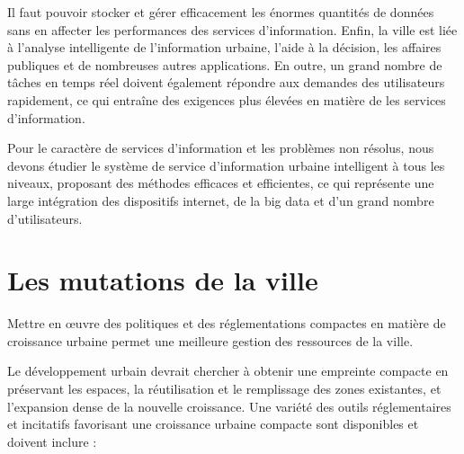 Il faut pouvoir stocker et gérer efficacement les énormes quantités de données sans en affecter
les performances des services d'information.
Enfin, la ville est liée à l'analyse intelligente de l'information urbaine, l'aide à la décision,
les affaires publiques et de nombreuses autres applications.
En outre, un grand nombre de tâches en temps réel doivent également répondre aux demandes des utilisateurs rapidement,
ce qui entraîne des exigences plus élevées en matière de les services d'information.

Pour le caractère de services d'information et les problèmes non résolus,
nous devons étudier le système de service d'information urbaine intelligent à tous les niveaux,
proposant des méthodes efficaces et efficientes, ce qui représente une large intégration des
dispositifs internet, de la big data et d'un grand nombre d'utilisateurs.

\section{Les mutations de la ville}

Mettre en œuvre des politiques et des réglementations compactes en matière de croissance urbaine
permet une meilleure gestion des ressources de la ville.

Le développement urbain devrait chercher à obtenir une empreinte compacte en préservant les
espaces, la réutilisation et le remplissage des zones existantes, et l'expansion dense de la nouvelle croissance.
Une variété des outils réglementaires et incitatifs favorisant une croissance urbaine compacte sont disponibles
et doivent inclure :

